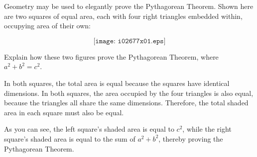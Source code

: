 

Geometry may be used to elegantly prove the Pythagorean Theorem.  Shown here are two squares of equal area, each with four right triangles embedded within, occupying area of their own:

$$\texttt{[image: i02677x01.eps]}$$

Explain how these two figures prove the Pythagorean Theorem, where $a^2 + b^2 = c^2$.







In both squares, the total area is equal because the squares have identical dimensions.  In both squares, the area occupied by the four triangles is also equal, because the triangles all share the same dimensions.  Therefore, the total shaded area in each square must also be equal.

\vskip 10pt

As you can see, the left square's shaded area is equal to $c^2$, while the right square's shaded area is equal to the sum of $a^2 + b^2$, thereby proving the Pythagorean Theorem.











